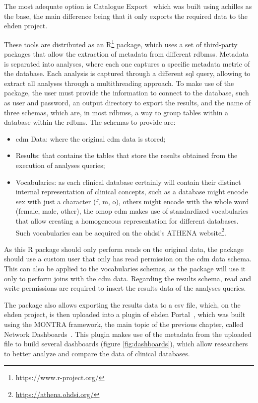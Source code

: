 The most adequate option is Catalogue Export~\cite{peters-tool} which was built using \gls{achilles} as the base, the main difference being that it only exports the required data to the \gls{ehden} project.

These tools are distributed as an R\footnote{https://www.r-project.org/} package, which uses a set of third-party packages that allow the extraction of metadata from different \gls{rdbms}s.
Metadata is separated into analyses, where each one captures a specific metadata metric of the database.
Each analysis is captured through a different \gls{sql} query, allowing to extract all analyses through a multithreading approach.
To make use of the package, the user must provide the information to connect to the database, such as user and password, an output directory to export the results, and the name of three schemas, which are, in most \gls{rdbms}s, a way to group tables within a database within the \gls{rdbms}.
The schemas to provide are:

\begin{itemize}
    \item \gls{cdm} Data: where the original \gls{cdm} data is stored;
    \item Results: that contains the tables that store the results obtained from the execution of analyses queries;
    \item Vocabularies: as each clinical database certainly will contain their distinct internal representation of clinical concepts, such as a database might encode sex with just a character (f, m, o), others might encode with the whole word (female, male, other), the \gls{omop} \gls{cdm} makes use of standardized vocabularies that allow creating a homogeneous representation for different databases.
        Such vocabularies can be acquired on the \gls{ohdsi}'s ATHENA website\footnote{\url{https://athena.ohdsi.org/}}.
\end{itemize}

As this R package should only perform reads on the original data, the package should use a custom user that only has read permission on the \gls{cdm} data schema.
This can also be applied to the vocabularies schemas, as the package will use it only to perform joins with the \gls{cdm} data.
Regarding the results schema, read and write permissions are required to insert the results data of the analyses queries.

The package also allows exporting the results data to a \gls{csv} file, which, on the \gls{ehden} project, is then uploaded into a plugin of \gls{ehden} Portal~\cite{ehden-portal}, which was built using the MONTRA framework, the main topic of the previous chapter, called Network Dashboards~\cite{dashboards}.
This plugin makes use of the metadata from the uploaded file to build several dashboards (figure \ref{fig:dashboards}), which allow researchers to better analyze and compare the data of clinical databases.

